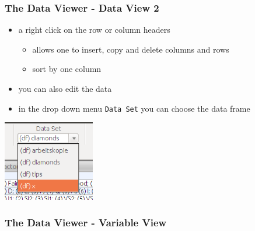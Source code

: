 \documentclass[xcolor={table},c]{beamer}
\begin{document}
\begin{frame}\frametitle{The Data Viewer - Data View 2}
  \begin{itemize}[<+->]
  \item a right click on the row or column headers 
    \begin{itemize}
    \item allows one to insert, copy and delete columns and rows 
    \item sort by one column
    \end{itemize}
  \item you can also edit the data
  \item in the drop down menu \texttt{Data Set} you can choose the data frame
  \end{itemize}
  \begin{center}
  \includegraphics[width=4cm]{dataviewer4.png}
\end{center}
\end{frame}

\begin{frame}\frametitle{The Data Viewer - Variable View}
  \begin{center}
  \end{center}
\end{frame}
\end{document}
